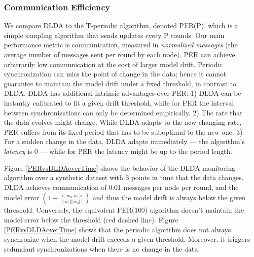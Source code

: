 \documentclass{vldb}
\begin{document}
\subsubsection{Communication Efficiency}\label{sec:com_eff}
We compare DLDA to the T-periodic algorithm, denoted
PER(P), which is a simple sampling algorithm that sends updates
every P rounds.
Our main performance metric is communication, measured in \textit{normalized messages} (the average number of messages sent per round by each node). 
PER can achieve arbitrarily low communication at the cost of larger model drift. 
Periodic synchronization can miss the point of change in the data; 
hence it cannot guarantee to maintain the model drift under a fixed threshold, in contrast to DLDA.  
DLDA has additional intrinsic advantages over PER: 
1) DLDA can be instantly calibrated to fit a given drift threshold, while for PER the 
interval between synchronizations can only be determined empirically. 
2) The rate that the data evolves might change. 
While DLDA adapts to the new changing rate, PER suffers from its fixed period
that has to be suboptimal to the new one.
3) For a sudden change in the data, DLDA adapts immediately --- the algorithm's
\textit{latency} is 0 --- while for PER the latency might be up to the period length.
	
Figure \ref{PERvsDLDAoverTime} shows the behavior of the DLDA monitoring
algorithm over a synthetic dataset with 3 points in time that the data changes.
DLDA achieves communication of 0.01 messages per node per round, and
the model error $(1 - \frac{<w_0,w>}{||w||||w_0||})$ and thus the model drift  is always below the given threshold.
Conversely, the equivalent PER(100) algorithm doesn't maintain the
model error below the threshold (red dashed line).
Figure \ref{PERvsDLDAoverTime} shows that the periodic algorithm does not always 
synchronize when the model drift exceeds a given threshold. 
Moreover, it triggers redundant synchronizations when there is no change in the data.
\end{document}
